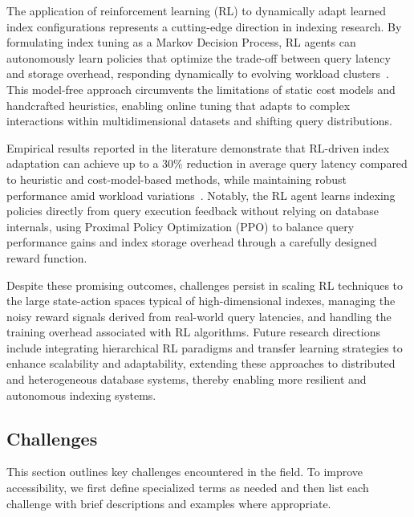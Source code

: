 \documentclass[sigconf]{acmart}
\begin{document}
The application of reinforcement learning (RL) to dynamically adapt learned index configurations represents a cutting-edge direction in indexing research. By formulating index tuning as a Markov Decision Process, RL agents can autonomously learn policies that optimize the trade-off between query latency and storage overhead, responding dynamically to evolving workload clusters~\cite{ref33}. This model-free approach circumvents the limitations of static cost models and handcrafted heuristics, enabling online tuning that adapts to complex interactions within multidimensional datasets and shifting query distributions.

Empirical results reported in the literature demonstrate that RL-driven index adaptation can achieve up to a 30\% reduction in average query latency compared to heuristic and cost-model-based methods, while maintaining robust performance amid workload variations~\cite{ref33}. Notably, the RL agent learns indexing policies directly from query execution feedback without relying on database internals, using Proximal Policy Optimization (PPO) to balance query performance gains and index storage overhead through a carefully designed reward function. 

Despite these promising outcomes, challenges persist in scaling RL techniques to the large state-action spaces typical of high-dimensional indexes, managing the noisy reward signals derived from real-world query latencies, and handling the training overhead associated with RL algorithms. Future research directions include integrating hierarchical RL paradigms and transfer learning strategies to enhance scalability and adaptability, extending these approaches to distributed and heterogeneous database systems, thereby enabling more resilient and autonomous indexing systems.

\subsection{Challenges}

This section outlines key challenges encountered in the field. To improve accessibility, we first define specialized terms as needed and then list each challenge with brief descriptions and examples where appropriate.
\end{document}
